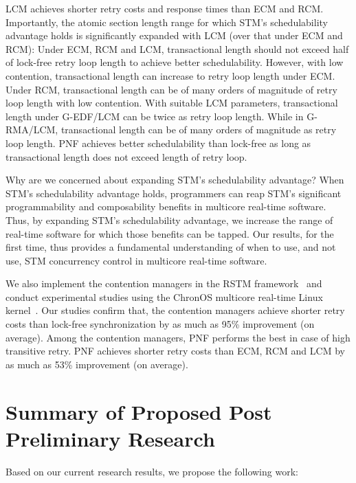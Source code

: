 \documentclass[12pt,english]{report}
\begin{document}
LCM achieves shorter retry costs and response times than ECM and RCM. Importantly, the atomic section length range for which STM's schedulability advantage holds is significantly expanded with LCM (over that under ECM and RCM): Under ECM, RCM and LCM, transactional length should not exceed half of lock-free retry loop length to achieve better schedulability. However, with low contention, transactional length can increase to retry loop length under ECM. Under RCM, transactional length can be of many orders of magnitude of retry loop length with low contention. With suitable LCM parameters, transactional length under G-EDF/LCM can be twice as retry loop length. While in G-RMA/LCM, transactional length can be of many orders of magnitude as retry loop length. PNF achieves better schedulability than lock-free as long as transactional length does not exceed length of retry loop.

Why are we concerned about expanding STM's schedulability advantage? When STM's schedulability advantage holds, programmers can reap STM's significant programmability and composability benefits in multicore real-time software. Thus, by expanding STM's schedulability advantage, we increase the range of real-time software for which those benefits can be tapped. Our results, for the first time, thus provides a fundamental understanding of when to use, and not use, STM concurrency control in multicore real-time software.

We also implement the contention managers in the RSTM framework~\cite{Shriraman:2007:IHA:1250662.1250676} and conduct experimental studies using the ChronOS multicore real-time Linux kernel~\cite{dellinger2011chronos}. Our studies confirm that, the contention managers achieve shorter retry costs than lock-free synchronization by as much as 95\% improvement (on average). Among the contention managers, PNF performs the best in case of high transitive retry. PNF achieves shorter retry costs than ECM, RCM and LCM by as much as 53\% improvement (on average).

\section{\label{sec:postprelim work} Summary of Proposed Post Preliminary Research}

Based on our current research results, we propose the following work:
\end{document}
